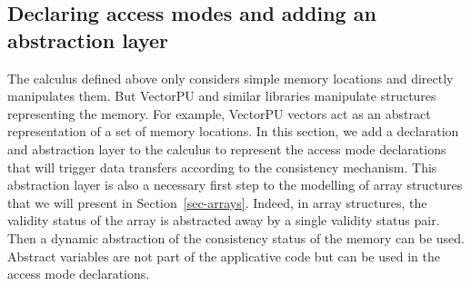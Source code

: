 \documentclass[preprint,12pt]{elsarticle}
\newcommand{\symb}[1]{\textit{#1}}
\newcommand{\Pull}{\symb{Pull}}
\newcommand{\isvalid}{\symb{isValid}}
\begin{document}
%


\subsection{Declaring access modes and adding an abstraction layer}
The calculus defined above only considers simple memory locations and directly manipulates 
them.
But VectorPU and  similar libraries manipulate structures 
representing the memory. For example, VectorPU vectors act as an
 abstract representation of a set of memory 
locations. In this section, we add a declaration and abstraction layer to the calculus to 
represent the access mode declarations that will trigger data transfers according to the 
consistency mechanism. 
This abstraction layer is also a necessary first step to the modelling of array 
structures that we will present in Section~\ref{sec-arrays}. Indeed, in array structures, 
the 
validity status of the array is abstracted away by a single validity status pair. Then 
a dynamic abstraction of the consistency status of the memory can be used.
Abstract variables are not part of the applicative code but can be used in the access mode declarations. 
\end{document}
